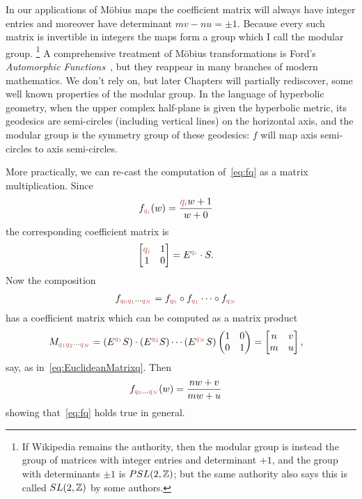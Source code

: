 In our applications of M\"obius maps the coefficient matrix will always have integer entries and moreover have determinant $mv-nu=\pm 1$. Because every such matrix is invertible in integers the maps form a group which I call the modular group.%
\footnote{If Wikipedia remains the authority, then the modular group is instead the group of matrices with integer entries and determinant $+1$, and the group with determinants $\pm 1$ is  $PSL(2,\mathbb{Z})$; but the same authority also says this is called $SL(2,\mathbb{Z})$ by some authors.}
A comprehensive treatment of M\"obius transformations is Ford's \textit{Automorphic Functions}~\cite{fordAutomorphicFunctions1951}, but they reappear in many branches of modern mathematics. We don't rely on, but later Chapters will partially rediscover, some well known properties of the modular group. In the language of hyperbolic geometry, when the upper complex half-plane is given the hyperbolic metric, its geodesics are semi-circles (including vertical lines) on the horizontal axis, and the modular group is the symmetry group of these geodesics: $f$ will map axis semi-circles to axis semi-circles. 

More practically, we can re-cast the computation of~\ref{eq:fq} as a matrix multiplication. Since 
\begin{align}
		f_\jqix{i}(\wC)  &=\frac{\jqix{i} \wC+1}{\wC+0}
\end{align}
the corresponding coefficient matrix is 
\begin{align}
	\begin{bmatrix}
	\jqix{i} & 1 \\ 1 & 0	\end{bmatrix}
	 &=E^{\jqix{i}}\cdot S.
\end{align}
Now the composition
\begin{align}
	f_{\jqix{0}\jqix{1}\cdots\jqix{N}} &= 	f_{\jqix{0}}\circ f_{\jqix{1}}\cdots\circ f_{\jqix{N}}
\end{align}
has a coefficient matrix which can be computed as a matrix product
\begin{align}
	M_{\jqn{q_1}\jqn{q_2}\cdots\jqn{q_N}}
  &= 
	(E^{\jqn{q_1}} S )\cdot( E^{\jqn{q_2}} S ) \cdots  (E^{\jqn{q_N}} S)  \begin{pmatrix} 1&0  \\ 0&1 \end{pmatrix}	=	\begin{bmatrix} n & v \\ m & u \end{bmatrix}, 
\end{align}
say, as in~\eqref{eq:EuclideanMatrixq}. Then 
\begin{align}
	f_{\jqix{0}\ldots \jqix{N}}(\wC) &= \frac{n\wC+v}{m\wC+u} 
\end{align}
showing that~\eqref{eq:fq} holds true in general. 

